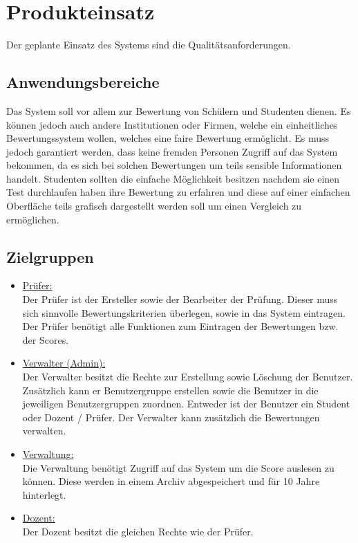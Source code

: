 \chapter{Produkteinsatz}
	Der geplante Einsatz des Systems sind die Qualitätsanforderungen.
	
	\section{Anwendungsbereiche}
	Das System soll vor allem zur Bewertung von Schülern und Studenten dienen. Es können jedoch auch andere Institutionen oder Firmen, welche ein einheitliches Bewertungssystem wollen, welches eine faire Bewertung ermöglicht. Es muss jedoch garantiert werden, dass keine fremden Personen Zugriff auf das System bekommen, da es sich bei solchen Bewertungen um teils sensible Informationen handelt. Studenten sollten die einfache Möglichkeit besitzen nachdem sie einen Test durchlaufen haben ihre Bewertung zu erfahren und diese auf einer einfachen Oberfläche teils grafisch dargestellt werden soll um einen Vergleich zu ermöglichen.
	
	\section{Zielgruppen}
	\begin{itemize}
		\item \underline{Prüfer:}\\
	Der Prüfer ist der Ersteller sowie der Bearbeiter der Prüfung. Dieser muss sich sinnvolle Bewertungskriterien überlegen, sowie in das System eintragen. Der Prüfer benötigt alle Funktionen zum Eintragen der Bewertungen bzw. der Scores.
	
		\item \underline{Verwalter (Admin):}\\
	Der Verwalter besitzt die Rechte zur Erstellung sowie Löschung der Benutzer. Zusätzlich kann er Benutzergruppe erstellen sowie die Benutzer in die jeweiligen Benutzergruppen zuordnen. Entweder ist der Benutzer ein Student oder Dozent / Prüfer. Der Verwalter kann zusätzlich die Bewertungen verwalten.
			
		\item \underline{Verwaltung:}\\
	Die Verwaltung benötigt Zugriff auf das System um die Score auslesen zu können. Diese werden in einem Archiv abgespeichert und für 10 Jahre hinterlegt. 	
	
	\item \underline{Dozent:}\\
	Der Dozent besitzt die gleichen Rechte wie der Prüfer.
		
	\end{itemize}

